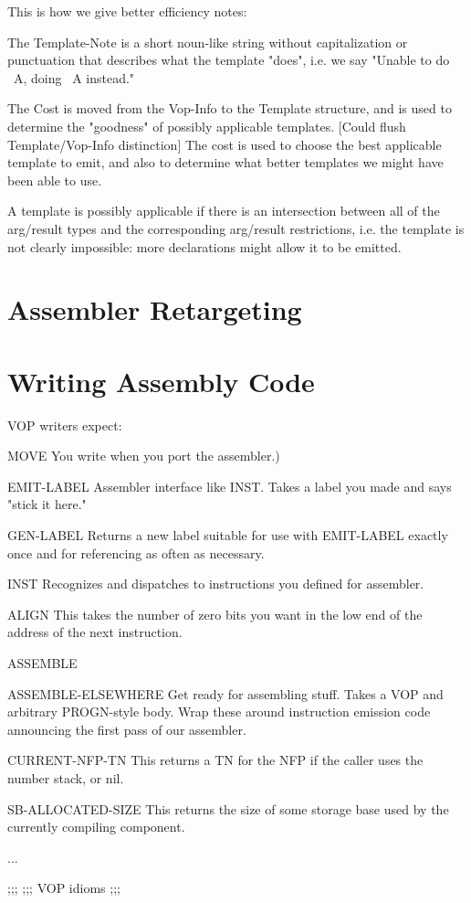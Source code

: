 This is how we give better efficiency notes:

The Template-Note is a short noun-like string without capitalization or
punctuation that describes what the template "does", i.e. we say
"Unable to do ~A, doing ~A instead."

The Cost is moved from the Vop-Info to the Template structure, and is used to
determine the "goodness" of possibly applicable templates.  [Could flush
Template/Vop-Info distinction]  The cost is used to choose the best applicable
template to emit, and also to determine what better templates we might have
been able to use.

A template is possibly applicable if there is an intersection between all of
the arg/result types and the corresponding arg/result restrictions, i.e. the
template is not clearly impossible: more declarations might allow it to be
emitted.


\chapter{Assembler Retargeting}


\chapter{Writing Assembly Code}

VOP writers expect:
\begin{Lentry}
\item[MOVE]
      You write when you port the assembler.)
\item[EMIT-LABEL]
      Assembler interface like INST.  Takes a label you made and says "stick it
      here."
   \item[GEN-LABEL]
      Returns a new label suitable for use with EMIT-LABEL exactly once and
      for referencing as often as necessary.
   \item[INST]
      Recognizes and dispatches to instructions you defined for assembler.
   \item[ALIGN]
      This takes the number of zero bits you want in the low end of the address
      of the next instruction.
   \item[ASSEMBLE]
   \item[ASSEMBLE-ELSEWHERE]
      Get ready for assembling stuff.  Takes a VOP and arbitrary PROGN-style
      body.  Wrap these around instruction emission code announcing the first
      pass of our assembler.
   \item[CURRENT-NFP-TN]
      This returns a TN for the NFP if the caller uses the number stack, or
      nil.
   \item[SB-ALLOCATED-SIZE]
      This returns the size of some storage base used by the currently
      compiling component.
   \item[...]
\end{Lentry}
;;;
;;; VOP idioms
;;;

